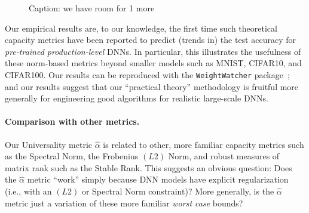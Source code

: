 \begin{figure}[H]
   \centering
   \caption{%
    Caption: we have room for 1 more 
   }
   \label{fig:alphahats}
\end{figure}


Our empirical results are, to our knowledge, the first time such theoretical capacity 
metrics have been reported to predict (trends in) the test accuracy for \emph{pre-trained production-level} DNNs.
In particular, this illustrates the usefulness of these norm-based metrics beyond smaller models such as MNIST, CIFAR10, and CIFAR100. 
Our  results can be reproduced with the \texttt{WeightWatcher} package~\cite{weightwatcher_package_justURL}; 
and our
results suggest that our ``practical theory'' methodology is fruitful more generally for engineering good algorithms for realistic large-scale DNNs.

\paragraph{Comparison with other metrics.}
Our Universality metric $\hat{\alpha}$ is related to other, more familiar capacity metrics such as the Spectral Norm, the Frobenius $(L2)$ Norm, and robust measures of matrix rank such as the Stable Rank.
This suggests an obvious question: 
Does the $\hat{\alpha}$ metric ``work'' simply because DNN models have explicit regularization (i.e., with an $(L2)$ or Spectral Norm constraint)?
More generally, is the $\hat{\alpha}$ metric just a variation of these more familiar \emph{worst case} bounds?  

